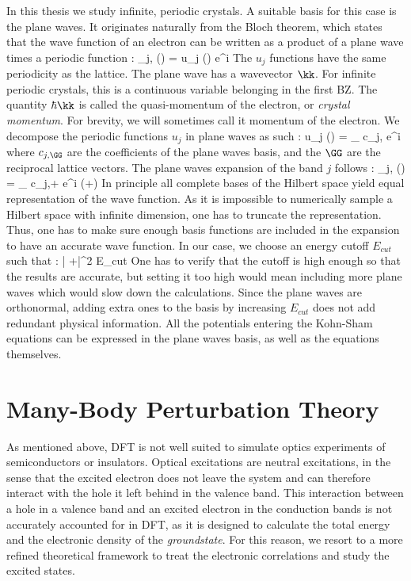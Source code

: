 In this thesis we study infinite, periodic crystals. A suitable basis for this case is the plane waves. It originates naturally from the Bloch theorem, which states that the wave function of an electron can be written as a product of a plane wave times a periodic function :
\be
 	\phi_{j,\kk} (\rr) = u_j (\rr) e^{i\kk\cdot\rr}
\ee
The $u_j$ functions have the same periodicity as the lattice. The plane wave has a wavevector $\kk$. For infinite periodic crystals, this is a continuous variable belonging in the first \acrfull{BZ}. The quantity $\hbar \kk$ is called the quasi-momentum of the electron, or \textit{crystal momentum}. For brevity, we will sometimes call it momentum of the electron.
We decompose the periodic functions $u_j$ in plane waves as such :
\be
 	u_j (\rr) = \sum_{\GG} c_{j,\GG} e^{i\GG \cdot \rr}
\ee
where $c_{j,\GG}$ are the coefficients of the plane waves basis, and the $\GG$ are the reciprocal lattice vectors. The plane waves expansion of the band $j$ follows :
\be
	\phi_{j,\kk} (\rr) = \sum_{\GG} c_{j,\kk+\GG} e^{i (\kk+\GG)\cdot \rr}
\ee
In principle all complete bases of the Hilbert space yield equal representation of the wave function. As it is impossible to numerically sample a Hilbert space with infinite dimension, one has to truncate the representation. Thus, one has to make sure enough basis functions are included in the expansion to have an accurate wave function. In our case, we choose an energy cutoff $E_{cut}$ such that :
\be
	 \left| \kk+\GG \right|^2 \leq E_{cut}
\ee
One has to verify that the cutoff is high enough so that the results are accurate, but setting it too high would mean including more plane waves which would slow down the calculations. Since the plane waves are orthonormal, adding extra ones to the basis by increasing $E_{cut}$ does not add redundant physical information. \cite{martin2020electronic} All the potentials entering the Kohn-Sham equations can be expressed in the plane waves basis, as well as the equations themselves.



%

\section{Many-Body Perturbation Theory}
As mentioned above, \acrshort{DFT} is not well suited to simulate optics experiments of semiconductors or insulators. Optical excitations are neutral excitations, in the sense that the excited electron does not leave the system and can therefore interact with the hole it left behind in the valence band. This interaction between a hole in a valence band and an excited electron in the conduction bands is not accurately accounted for in \acrshort{DFT}, as it is designed to calculate the total energy and the electronic density of the \textit{groundstate}. For this reason, we resort to a more refined theoretical framework to treat the electronic correlations and study the excited states.

